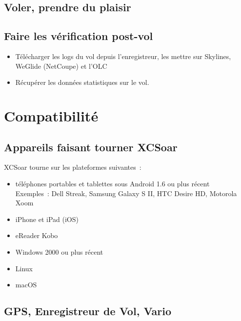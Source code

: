 \subsection*{Voler, prendre du plaisir}
\vspace{4em}

\subsection*{Faire les vérification post-vol}
\begin{itemize}
\item Télécharger les logs du vol depuis l'enregistreur, les mettre sur Skylines, WeGlide (NetCoupe) et l'OLC
\item Récupérer les données statistiques sur le vol.
\end{itemize}
\newpage

\section{Compatibilité}

\subsection*{Appareils faisant tourner XCSoar}

XCSoar tourne sur les plateformes suivantes~:
\begin{itemize}
\item téléphones portables et tablettes sous Android 1.6 ou plus récent \\
 Exemples~: Dell Streak, Samsung Galaxy S II, HTC Desire HD,
 Motorola Xoom
\item iPhone et iPad (iOS)
\item eReader Kobo
\item Windows 2000 ou plus récent
\item Linux
\item macOS
\end{itemize}

\subsection*{GPS, Enregistreur de Vol, Vario}

